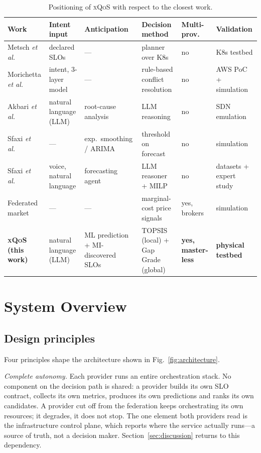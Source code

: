\documentclass[conference]{IEEEtran}
\begin{document}
\begin{table}[!t]
\centering
\caption{Positioning of \textsc{xQoS} with respect to the closest work.}
\label{tab:related}
\footnotesize
\renewcommand{\arraystretch}{1.2}
\setlength{\tabcolsep}{4pt}
\begin{tabularx}{\textwidth}{@{}p{3.05cm} X X X p{1.75cm} X@{}}
\toprule
\textbf{Work} & \textbf{Intent input} & \textbf{Anticipation} &
\textbf{Decision method} & \textbf{Multi-prov.} & \textbf{Validation}\\
\midrule
Metsch \emph{et al.}~\cite{metsch2023}
  & declared SLOs & --- & planner over K8s & no & K8s testbed \\
Morichetta \emph{et al.}~\cite{morichetta2023}
  & intent, 3-layer model & --- & rule-based conflict resolution & no
  & AWS PoC + simulation \\
Akbari \emph{et al.}~\cite{akbari2025intentcontinuum}
  & natural language (LLM) & root-cause analysis & LLM reasoning & no
  & SDN emulation \\
Sfaxi \emph{et al.}~\cite{sfaxi2024tnsm}
  & --- & exp.\ smoothing / ARIMA & threshold on forecast & no
  & simulation \\
Sfaxi \emph{et al.}~\cite{sfaxi2026policies}
  & voice, natural language & forecasting agent & LLM reasoner + MILP & no
  & datasets + expert study \\
Federated market~\cite{federatedmarket2026}
  & --- & --- & marginal-cost price signals & yes, brokers & simulation \\
\addlinespace[2pt]
\textbf{\textsc{xQoS} (this work)}
  & natural language (LLM) & ML prediction + MI-discovered SLOs
  & TOPSIS (local) + Gap Grade (global) & \textbf{yes, master-less}
  & \textbf{physical testbed} \\
\bottomrule
\end{tabularx}
\end{table}

\section{System Overview}
\label{sec:overview}

\subsection{Design principles}

Four principles shape the architecture shown in
Fig.~\ref{fig:architecture}.

\emph{Complete autonomy.} Each provider runs an entire orchestration stack.
No component on the decision path is shared: a provider builds its own SLO
contract, collects its own metrics, produces its own predictions and ranks
its own candidates. A provider cut off from the federation keeps orchestrating
its own resources; it degrades, it does not stop. The one element both
providers read is the infrastructure control plane, which reports where the
service actually runs---a source of truth, not a decision maker.
Section~\ref{sec:discussion} returns to this dependency.
\end{document}
